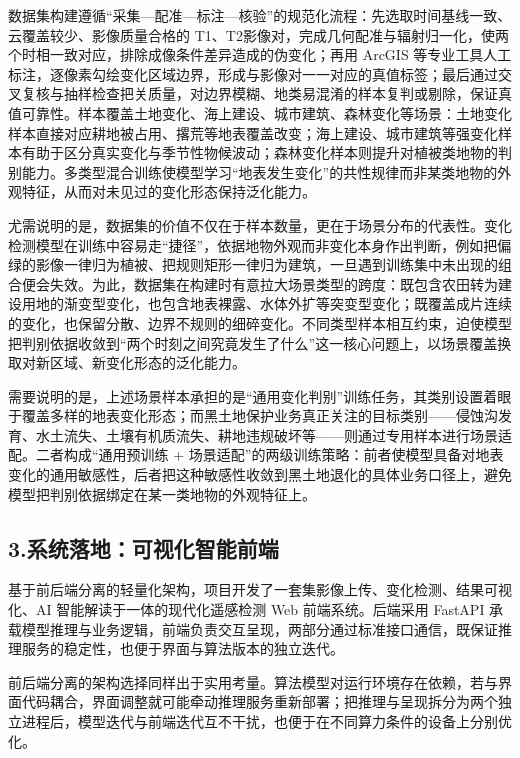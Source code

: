 \documentclass[12pt, a4paper]{ctexart}
\begin{document}
数据集构建遵循“采集—配准—标注—核验”的规范化流程：先选取时间基线一致、云覆盖较少、影像质量合格的 T1、T2影像对，完成几何配准与辐射归一化，使两个时相一致对应，排除成像条件差异造成的伪变化；再用 ArcGIS 等专业工具人工标注，逐像素勾绘变化区域边界，形成与影像对一一对应的真值标签；最后通过交叉复核与抽样检查把关质量，对边界模糊、地类易混淆的样本复判或剔除，保证真值可靠性。样本覆盖土地变化、海上建设、城市建筑、森林变化等场景：土地变化样本直接对应耕地被占用、撂荒等地表覆盖改变；海上建设、城市建筑等强变化样本有助于区分真实变化与季节性物候波动；森林变化样本则提升对植被类地物的判别能力。多类型混合训练使模型学习“地表发生变化”的共性规律而非某类地物的外观特征，从而对未见过的变化形态保持泛化能力。

尤需说明的是，数据集的价值不仅在于样本数量，更在于场景分布的代表性。变化检测模型在训练中容易走“捷径”，依据地物外观而非变化本身作出判断，例如把偏绿的影像一律归为植被、把规则矩形一律归为建筑，一旦遇到训练集中未出现的组合便会失效。为此，数据集在构建时有意拉大场景类型的跨度：既包含农田转为建设用地的渐变型变化，也包含地表裸露、水体外扩等突变型变化；既覆盖成片连续的变化，也保留分散、边界不规则的细碎变化。不同类型样本相互约束，迫使模型把判别依据收敛到“两个时刻之间究竟发生了什么”这一核心问题上，以场景覆盖换取对新区域、新变化形态的泛化能力。

需要说明的是，上述场景样本承担的是“通用变化判别”训练任务，其类别设置着眼于覆盖多样的地表变化形态；而黑土地保护业务真正关注的目标类别——侵蚀沟发育、水土流失、土壤有机质流失、耕地违规破坏等——则通过专用样本进行场景适配。二者构成“通用预训练 + 场景适配”的两级训练策略：前者使模型具备对地表变化的通用敏感性，后者把这种敏感性收敛到黑土地退化的具体业务口径上，避免模型把判别依据绑定在某一类地物的外观特征上。

\subsection{3.系统落地：可视化智能前端}

基于前后端分离的轻量化架构，项目开发了一套集影像上传、变化检测、结果可视化、AI 智能解读于一体的现代化遥感检测 Web 前端系统。后端采用 FastAPI 承载模型推理与业务逻辑，前端负责交互呈现，两部分通过标准接口通信，既保证推理服务的稳定性，也便于界面与算法版本的独立迭代。

前后端分离的架构选择同样出于实用考量。算法模型对运行环境存在依赖，若与界面代码耦合，界面调整就可能牵动推理服务重新部署；把推理与呈现拆分为两个独立进程后，模型迭代与前端迭代互不干扰，也便于在不同算力条件的设备上分别优化。
\end{document}
